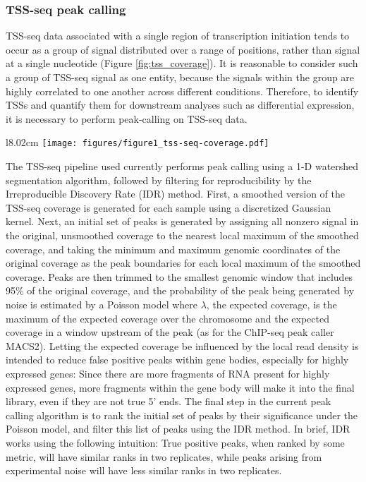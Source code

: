 \documentclass[11pt, letterpaper]{article}
\begin{document}
\subsubsection{TSS-seq peak calling}

TSS-seq data associated with a single region of transcription initiation tends to occur as a group of signal distributed over a range of positions, rather than signal at a single nucleotide (Figure \ref{fig:tss_coverage}). It is reasonable to consider such a group of TSS-seq signal as one entity, because the signals within the group are highly correlated to one another across different conditions. Therefore, to identify TSSs and quantify them for downstream analyses such as differential expression, it is necessary to perform peak-calling on TSS-seq data.

\begin{wrapfigure}[13]{l}{8.02cm}
\centering
\texttt{[image: figures/figure1\_tss-seq-coverage.pdf]}
\caption{Wild-type sense strand TSS-seq signal at the TEF1 genic TSS. Normalized counts are the mean of spike-in normalized coverage from two replicates.}
\label{fig:tss_coverage}
\end{wrapfigure}

The TSS-seq pipeline used currently performs peak calling using a 1-D watershed segmentation algorithm, followed by filtering for reproducibility by the Irreproducible Discovery Rate (IDR) method. First, a smoothed version of the TSS-seq coverage is generated for each sample using a discretized Gaussian kernel. Next, an initial set of peaks is generated by assigning all nonzero signal in the original, unsmoothed coverage to the nearest local maximum of the smoothed coverage, and taking the minimum and maximum genomic coordinates of the original coverage as the peak boundaries for each local maximum of the smoothed coverage. Peaks are then trimmed to the smallest genomic window that includes 95\% of the original coverage, and the probability of the peak being generated by noise is estimated by a Poisson model where $\lambda$, the expected coverage, is the maximum of the expected coverage over the chromosome and the expected coverage in a window upstream of the peak (as for the ChIP-seq peak caller MACS2). Letting the expected coverage be influenced by the local read density is intended to reduce false positive peaks within gene bodies, especially for highly expressed genes: Since there are more fragments of RNA present for highly expressed genes, more fragments within the gene body will make it into the final library, even if they are not true 5' ends. The final step in the current peak calling algorithm is to rank the initial set of peaks by their significance under the Poisson model, and filter this list of peaks using the IDR method. In brief, IDR works using the following intuition: True positive peaks, when ranked by some metric, will have similar ranks in two replicates, while peaks arising from experimental noise will have less similar ranks in two replicates.
\end{document}

